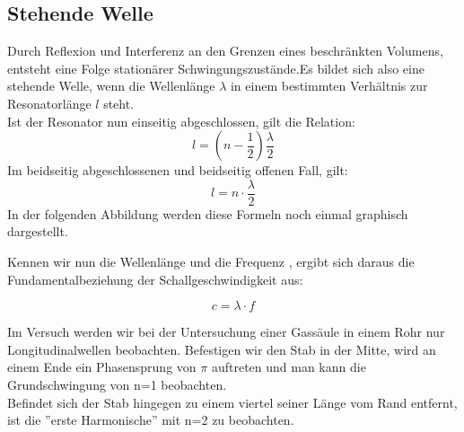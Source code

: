 \documentclass{article}
\begin{document}
{\subsection{Stehende Welle}
Durch Reflexion und Interferenz an den Grenzen eines beschränkten Volumens, entsteht eine Folge stationärer Schwingungszustände.Es bildet sich also eine stehende Welle, wenn die Wellenlänge \(\lambda\) in einem bestimmten Verhältnis zur Resonatorlänge \(l\) steht.\\
Ist der Resonator nun einseitig abgeschlossen, gilt die Relation:
\begin{equation}
l=\left(n-\frac{1}{2}\right)\frac{\lambda}{2} \label{geschlossen}
\end{equation}
Im beidseitig abgeschlossenen und beidseitig offenen Fall, gilt:
\begin{equation}
l=n\cdot\frac{\lambda}{2} \label{offen}
\end{equation}
In der folgenden Abbildung werden diese Formeln noch einmal graphisch dargestellt.
{\begin{center}
\begin{minipage}{\linewidth}
\centering
{}
\label{welle}
\end{minipage}
\end{center}

Kennen wir nun die Wellenlänge und die Frequenz , ergibt sich daraus die Fundamentalbeziehung der Schallgeschwindigkeit aus:

\begin{equation}
c=\lambda\cdot f
\end{equation}

Im Versuch werden wir bei der Untersuchung einer Gassäule in einem Rohr nur Longitudinalwellen beobachten. Befestigen wir den Stab in der Mitte, wird an einem Ende ein Phasensprung von \(\pi\) auftreten und man kann die Grundschwingung von n=1 beobachten.\\
Befindet sich der Stab hingegen zu einem viertel seiner Länge vom Rand entfernt, ist die ''erste Harmonische'' mit n=2 zu beobachten.\\


}}
\end{document}
